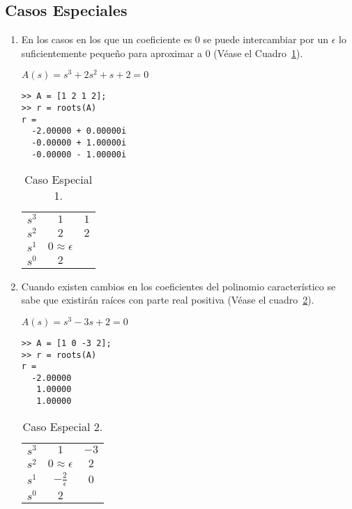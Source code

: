 \documentclass[12pt]{article}
\numberwithin{equation}{subsection}
\begin{document}
\subsection{Casos Especiales}
\begin{enumerate}

\item
En los casos en los que un coeficiente es $0$ se puede intercambiar por un $\epsilon$ lo suficientemente pequeño para aproximar a $0$ (Véase el Cuadro~\ref{tab:Caso1}).

\begin{math}
A(s) = s^3 + 2 s^2 + s + 2 = 0
\end{math}

\begin{verbatim}
>> A = [1 2 1 2];
>> r = roots(A)
r =
  -2.00000 + 0.00000i
  -0.00000 + 1.00000i
  -0.00000 - 1.00000i
\end{verbatim}

\begin{table}[htbp]
\centering
\begin{tabular}{c|c c}
$s^3$ & $1$ & $1$ \\
$s^2$ & $2$ & $2$ \\
$s^1$ & $0 \approx \epsilon$ \\
$s^0$ & $2$
\end{tabular}
\caption{\label{tab:Caso1}Caso Especial 1.}
\end{table}

\item
Cuando existen cambios en los coeficientes del polinomio característico se sabe que existirán raíces con parte real positiva (Véase el cuadro~\ref{tab:Caso2}).

\begin{math}
A(s) = s^3 - 3 s + 2 = 0
\end{math}

\begin{verbatim}
>> A = [1 0 -3 2];
>> r = roots(A)
r =
  -2.00000
   1.00000
   1.00000
\end{verbatim}

\begin{table}[htbp]
\centering
\begin{tabular}{c|c c}
$s^3$ & $1$ & $-3$ \\
$s^2$ & $0\approx\epsilon$ & $2$ \\
$s^1$ & $-\frac{2}{\epsilon}$ & $0$ \\
$s^0$ & $2$
\end{tabular}
\caption{\label{tab:Caso2}Caso Especial 2.}
\end{table}


\end{enumerate}
\end{document}
